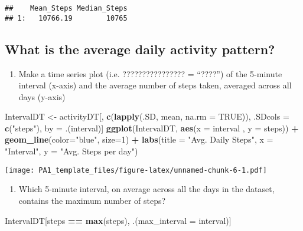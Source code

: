 \documentclass[]{article}
\newenvironment{Shaded}{\begin{snugshade}}{\end{snugshade}}
\newcommand{\KeywordTok}[1]{\textcolor[rgb]{0.13,0.29,0.53}{\textbf{#1}}}
\newcommand{\DataTypeTok}[1]{\textcolor[rgb]{0.13,0.29,0.53}{#1}}
\newcommand{\DecValTok}[1]{\textcolor[rgb]{0.00,0.00,0.81}{#1}}
\newcommand{\StringTok}[1]{\textcolor[rgb]{0.31,0.60,0.02}{#1}}
\newcommand{\OtherTok}[1]{\textcolor[rgb]{0.56,0.35,0.01}{#1}}
\newcommand{\OperatorTok}[1]{\textcolor[rgb]{0.81,0.36,0.00}{\textbf{#1}}}
\newcommand{\NormalTok}[1]{#1}
\providecommand{\tightlist}{%
  \setlength{\itemsep}{0pt}\setlength{\parskip}{0pt}}
\begin{document}
\begin{verbatim}
##    Mean_Steps Median_Steps
## 1:   10766.19        10765
\end{verbatim}

\subsection{What is the average daily activity
pattern?}\label{what-is-the-average-daily-activity-pattern}

\begin{enumerate}
\def\labelenumi{\arabic{enumi}.}
\tightlist
\item
  Make a time series plot (i.e. ???????????????? = ``????'') of the
  5-minute interval (x-axis) and the average number of steps taken,
  averaged across all days (y-axis)
\end{enumerate}

\begin{Shaded}
\begin{Highlighting}[]
\NormalTok{IntervalDT <-}\StringTok{ }\NormalTok{activityDT[, }\KeywordTok{c}\NormalTok{(}\KeywordTok{lapply}\NormalTok{(.SD, mean, }\DataTypeTok{na.rm =} \OtherTok{TRUE}\NormalTok{)), .SDcols =}\StringTok{ }\KeywordTok{c}\NormalTok{(}\StringTok{"steps"}\NormalTok{), by =}\StringTok{ }\NormalTok{.(interval)] }
\KeywordTok{ggplot}\NormalTok{(IntervalDT, }\KeywordTok{aes}\NormalTok{(}\DataTypeTok{x =}\NormalTok{ interval , }\DataTypeTok{y =}\NormalTok{ steps)) }\OperatorTok{+}\StringTok{ }\KeywordTok{geom_line}\NormalTok{(}\DataTypeTok{color=}\StringTok{"blue"}\NormalTok{, }\DataTypeTok{size=}\DecValTok{1}\NormalTok{) }\OperatorTok{+}\StringTok{ }\KeywordTok{labs}\NormalTok{(}\DataTypeTok{title =} \StringTok{"Avg. Daily Steps"}\NormalTok{, }\DataTypeTok{x =} \StringTok{"Interval"}\NormalTok{, }\DataTypeTok{y =} \StringTok{"Avg. Steps per day"}\NormalTok{)}
\end{Highlighting}
\end{Shaded}

\texttt{[image: PA1\_template\_files/figure-latex/unnamed-chunk-6-1.pdf]}

\begin{enumerate}
\def\labelenumi{\arabic{enumi}.}
\setcounter{enumi}{1}
\tightlist
\item
  Which 5-minute interval, on average across all the days in the
  dataset, contains the maximum number of steps?
\end{enumerate}

\begin{Shaded}
\begin{Highlighting}[]
\NormalTok{IntervalDT[steps }\OperatorTok{==}\StringTok{ }\KeywordTok{max}\NormalTok{(steps), .(}\DataTypeTok{max_interval =}\NormalTok{ interval)]}
\end{Highlighting}
\end{Shaded}
\end{document}
